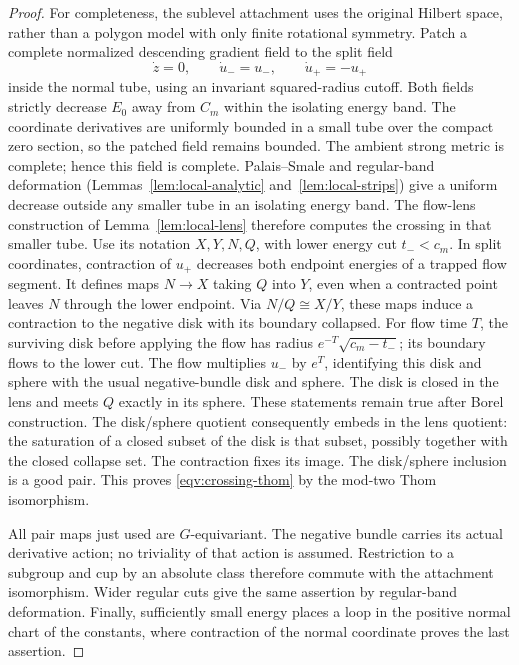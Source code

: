 \begin{proof}
For completeness, the sublevel attachment uses the original Hilbert
space, rather than a polygon model with only finite rotational
symmetry.  Patch a complete normalized descending gradient field to
the split field
\[
 \dot z=0,\qquad \dot u_-=u_-,\qquad \dot u_+=-u_+
\]
inside the normal tube, using an invariant squared-radius cutoff.
Both fields strictly decrease \(E_0\) away from \(C_m\) within the
isolating energy band.
The coordinate derivatives are uniformly bounded in a small tube over
the compact zero section, so the patched field remains bounded.
The ambient strong metric is complete; hence this field is complete.
Palais--Smale and regular-band deformation
(Lemmas~\ref{lem:local-analytic} and~\ref{lem:local-strips})
give a uniform decrease outside any smaller tube in an isolating
energy band.
The flow-lens construction of Lemma~\ref{lem:local-lens}
therefore computes the crossing in that smaller tube.
Use its notation \(X,Y,N,Q\), with lower energy cut \(t_-<c_m\).
In split coordinates, contraction of \(u_+\) decreases both endpoint
energies of a trapped flow segment.  It defines maps \(N\to X\)
taking \(Q\) into \(Y\), even when a contracted point leaves \(N\)
through the lower endpoint.  Via \(N/Q\cong X/Y\), these maps induce
a contraction to the negative disk with its boundary collapsed.
For flow time \(T\), the surviving disk before applying the flow has
radius \(e^{-T}\sqrt{c_m-t_-}\); its boundary flows to the lower cut.
The flow multiplies \(u_-\) by \(e^T\), identifying this disk and
sphere with the usual negative-bundle disk and sphere.
The disk is closed in the lens and meets \(Q\) exactly in its sphere.
These statements remain true after Borel construction.
The disk/sphere quotient consequently embeds in the lens quotient:
the saturation of a closed subset of the disk is that subset,
possibly together with the closed collapse set.
The contraction fixes its image.
The disk/sphere inclusion is a good pair.  This proves
\eqref{eqv:crossing-thom} by the mod-two Thom isomorphism.

All pair maps just used are \(G\)-equivariant.  The negative bundle
carries its actual derivative action; no triviality of that action
is assumed.  Restriction to a subgroup and cup by an absolute class
therefore commute with the attachment isomorphism.
Wider regular cuts give the same assertion by regular-band
deformation.  Finally, sufficiently small energy places a loop in
the positive normal chart of the constants, where contraction of
the normal coordinate proves the last assertion.
\end{proof}

